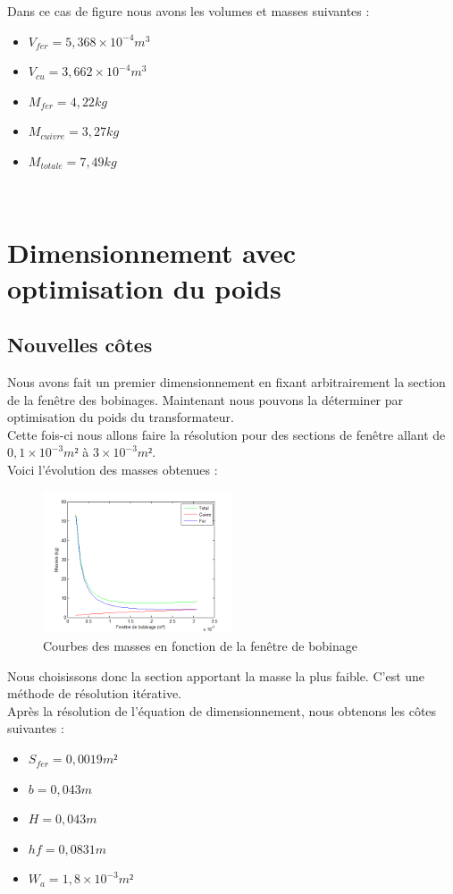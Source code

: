 Dans ce cas de figure nous avons les volumes et masses suivantes : \\
\begin{itemize}
\item $V_{fer} = 5,368 \times{}10^{-4} m^3$
\item $V_{cu} = 3,662 \times{}10^{-4} m^3$
\item $M_{fer} = 4,22 kg$
\item $M_{cuivre} = 3,27 kg $
\item $M_{totale} = 7,49 kg $
\end{itemize}~\\

\newpage
\section{Dimensionnement avec optimisation du poids}
\subsection{Nouvelles côtes}
Nous avons fait un premier dimensionnement en fixant arbitrairement la section  de la fenêtre des bobinages. Maintenant nous pouvons la déterminer par optimisation du poids du transformateur.\\
Cette fois-ci nous allons faire la résolution pour des sections de fenêtre allant de $0,1\times{}10^{-3} m²$ à $3\times{}10^{-3} m²$.\\

Voici l'évolution des masses obtenues : 
\begin{figure}[h]
	\begin{center}
	\includegraphics[width=0.5\textwidth]{images/TP1_plot_masses}
	\caption{Courbes des masses en fonction de la fenêtre de bobinage}\label{img:plotMasses}
	\end{center}
\end{figure}
\FloatBarrier 

Nous choisissons donc la section apportant la masse la plus faible. C'est une méthode de résolution itérative.\\
Après la résolution de l'équation de dimensionnement, nous obtenons les côtes suivantes : \\
\begin{itemize}
\item $S_{fer} = 0,0019 m² $
\item $b = 0,043 m $
\item $H = 0,043 m $
\item $hf = 0,0831 m $
\item $W_a = 1,8\times{}10^{-3} m² $
\end{itemize}~\\

